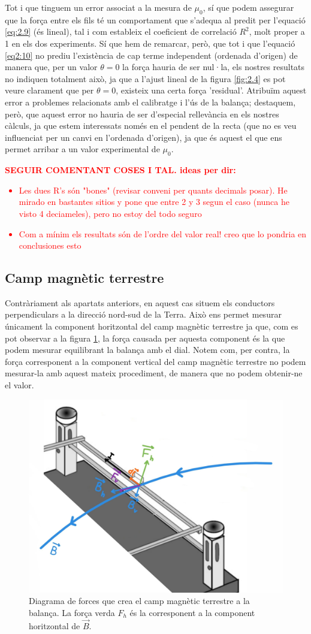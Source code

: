 \documentclass[a4paper,10.5pt]{report}
\begin{document}
Tot i que tinguem un error associat a la mesura de $\mu_0$, sí que podem assegurar que la força entre els fils té un comportament que s'adequa al predit per l'equació \ref{eq:2.9} (és lineal), tal i com estableix el coeficient de correlació $R^2$, molt proper a 1 en els dos experiments. Sí que hem de remarcar, però, que tot i que l'equació \ref{eq2:10} no prediu l'existència de cap terme independent (ordenada d'origen) de manera que, per un valor $\theta = 0$ la força hauria de ser nul·la, els nostres resultats no indiquen totalment això, ja que a l'ajust lineal de la figura \ref{fig:2.4} es pot veure clarament que per $\theta = 0$, existeix una certa força 'residual'. Atribuïm aquest error a problemes relacionats amb el calibratge i l'ús de la balança; destaquem, però, que aquest error no hauria de ser d'especial rellevància en els nostres càlculs, ja que estem interessats només en el pendent de la recta (que no es veu influenciat per un canvi en l'ordenada d'origen), ja que és aquest el que ens permet arribar a un valor experimental de $\mu_0$.

 \textcolor{red}{\textbf{SEGUIR COMENTANT COSES I TAL. ideas per dir:}
 	\begin{itemize}
 		\item Les dues R's són "bones" (revisar conveni per quants decimals posar). He mirado en bastantes sitios y pone que entre 2 y 3 segun el caso (nunca he visto 4 deciameles), pero no estoy del todo seguro
 		\item Com a mínim els resultats són de l'ordre del valor real! creo  que lo pondria en conclusiones esto
 	\end{itemize}}



\subsection{Camp magnètic terrestre}
Contràriament als apartats anteriors, en aquest cas situem els conductors perpendiculars a la direcció nord-sud de la Terra. Això ens permet mesurar únicament la component horitzontal del camp magnètic terrestre ja que, com es pot observar a la figura \ref{fig2:6}, la força causada per aquesta component és la que podem mesurar equilibrant la balança amb el dial. Notem com, per contra, la força corresponent a la component vertical del camp magnètic terrestre no podem mesurar-la amb aquest mateix procediment, de manera que no podem obtenir-ne el valor.

\begin{figure}[H]
	\centering
	\includegraphics[width=0.35\linewidth]{screenshot019}
	\caption{Diagrama de forces que crea el camp magnètic terrestre a la balança. La força verda $F_h$ és la corresponent a la component horitzontal de $\vec{B}$.}
	\label{fig2:6}
\end{figure}
\end{document}
